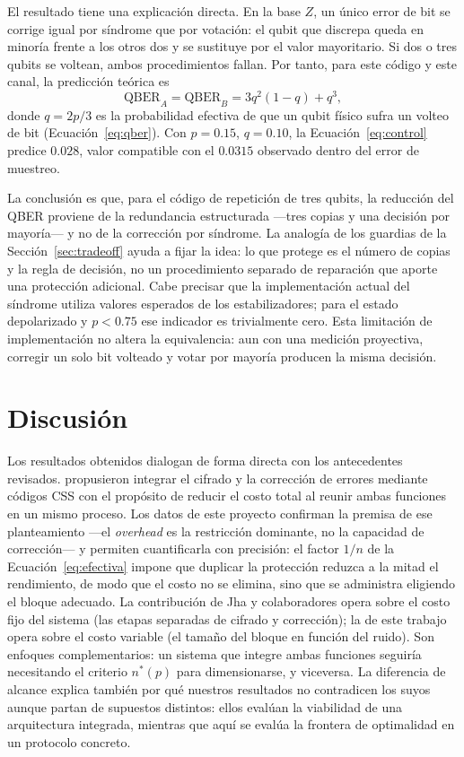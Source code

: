 \documentclass[12pt]{report}
\begin{document}
El resultado tiene una explicación directa. En la base \(Z\), un único error de
bit se corrige igual por síndrome que por votación: el qubit que discrepa queda
en minoría frente a los otros dos y se sustituye por el valor mayoritario. Si dos
o tres qubits se voltean, ambos procedimientos fallan. Por tanto, para este
código y este canal, la predicción teórica es
\begin{equation}
\mathrm{QBER}_{A} = \mathrm{QBER}_{B} = 3q^{2}(1-q) + q^{3},
\label{eq:control}
\end{equation}
donde \(q=2p/3\) es la probabilidad efectiva de que un qubit físico sufra un
volteo de bit (Ecuación~\eqref{eq:qber}). Con \(p=0.15\), \(q=0.10\), la
Ecuación~\eqref{eq:control} predice \(0.028\), valor compatible con el \(0.0315\)
observado dentro del error de muestreo.

La conclusión es que, para el código de repetición de tres qubits, la reducción
del QBER proviene de la redundancia estructurada —tres copias y una decisión por
mayoría— y no de la corrección por síndrome. La analogía de los guardias de la
Sección~\ref{sec:tradeoff} ayuda a fijar la idea: lo que protege es el número de
copias y la regla de decisión, no un procedimiento separado de reparación que
aporte una protección adicional. Cabe precisar que la implementación actual del
síndrome utiliza valores esperados de los estabilizadores; para el estado
depolarizado y \(p<0.75\) ese indicador es trivialmente cero. Esta limitación de
implementación no altera la equivalencia: aun con una medición proyectiva,
corregir un solo bit volteado y votar por mayoría producen la misma decisión.

\section{Discusión}

Los resultados obtenidos dialogan de forma directa con los antecedentes
revisados. \citet{jha2024} propusieron integrar el cifrado y la corrección de
errores mediante códigos CSS con el propósito de reducir el costo total al reunir
ambas funciones en un mismo proceso. Los datos de este proyecto confirman la
premisa de ese planteamiento —el \textit{overhead} es la restricción dominante,
no la capacidad de corrección— y permiten cuantificarla con precisión: el factor
\(1/n\) de la Ecuación~\eqref{eq:efectiva} impone que duplicar la protección
reduzca a la mitad el rendimiento, de modo que el costo no se elimina, sino que
se administra eligiendo el bloque adecuado. La contribución de Jha y
colaboradores opera sobre el costo fijo del sistema (las etapas separadas de
cifrado y corrección); la de este trabajo opera sobre el costo variable (el
tamaño del bloque en función del ruido). Son enfoques complementarios: un sistema
que integre ambas funciones seguiría necesitando el criterio \(n^{*}(p)\) para
dimensionarse, y viceversa. La diferencia de alcance explica también por qué
nuestros resultados no contradicen los suyos aunque partan de supuestos distintos:
ellos evalúan la viabilidad de una arquitectura integrada, mientras que aquí se
evalúa la frontera de optimalidad en un protocolo concreto.
\end{document}
